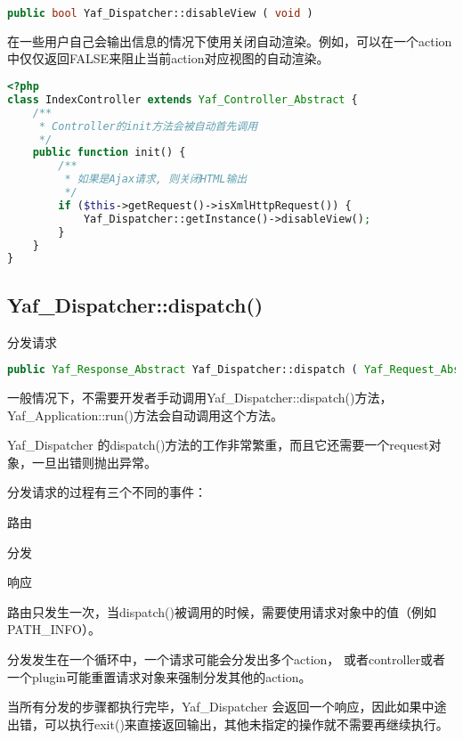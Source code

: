 \begin{lstlisting}[language=PHP]
public bool Yaf_Dispatcher::disableView ( void )
\end{lstlisting}

在一些用户自己会输出信息的情况下使用关闭自动渲染。例如，可以在一个action中仅仅返回FALSE来阻止当前action对应视图的自动渲染。

\begin{lstlisting}[language=PHP]
<?php
class IndexController extends Yaf_Controller_Abstract {
    /**
     * Controller的init方法会被自动首先调用
     */
    public function init() {
        /**
         * 如果是Ajax请求, 则关闭HTML输出
         */
        if ($this->getRequest()->isXmlHttpRequest()) {
            Yaf_Dispatcher::getInstance()->disableView();
        }
    }
}
\end{lstlisting}


\subsection{Yaf\_Dispatcher::dispatch()}

分发请求


\begin{lstlisting}[language=PHP]
public Yaf_Response_Abstract Yaf_Dispatcher::dispatch ( Yaf_Request_Abstract $request )
\end{lstlisting}

一般情况下，不需要开发者手动调用Yaf\_Dispatcher::dispatch()方法，Yaf\_Application::run()方法会自动调用这个方法。

Yaf\_Dispatcher 的dispatch()方法的工作非常繁重，而且它还需要一个request对象，一旦出错则抛出异常。

分发请求的过程有三个不同的事件：

\begin{compactitem}
\item 路由
\item 分发
\item 响应
\end{compactitem}

路由只发生一次，当dispatch()被调用的时候，需要使用请求对象中的值（例如PATH\_INFO）。

分发发生在一个循环中，一个请求可能会分发出多个action， 或者controller或者一个plugin可能重置请求对象来强制分发其他的action。 

当所有分发的步骤都执行完毕，Yaf\_Dispatcher 会返回一个响应，因此如果中途出错，可以执行exit()来直接返回输出，其他未指定的操作就不需要再继续执行。






